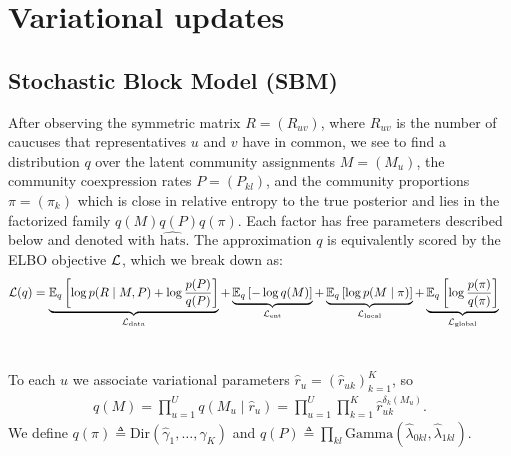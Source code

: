 \documentclass{article}
\begin{document}
\section{Variational updates}

\subsection{Stochastic Block Model (SBM)}
\label{sbmvi}

After observing the symmetric matrix $R = (R_{uv})$, where $R_{uv}$ is the number of caucuses that representatives $u$ and $v$ have in common, we see to find a distribution $q$ over the latent community assignments $M = (M_u)$, the community coexpression rates $P = (P_{kl})$, and the community proportions $\pi = (\pi_k)$ which is close in relative entropy to the true posterior and lies in the factorized family $q(M)q(P)q(\pi)$. Each factor has free parameters described below and denoted with $\widehat{\text{hats}}$. The approximation $q$ is equivalently scored by the ELBO objective $\mathcal{L}$, which we break down as:%
\begin{equation*}
\begin{split}
\mathcal{L}(q)
&= \underbrace{\mathbb{E}_q\left[\log p(R\mid M,P)+ \log\frac{p(P)}{q(P)}\right]}_{\mathcal{L}_{\text{data}}}
+ \underbrace{\mathbb{E}_q\left[-\log q(M)\right]}_{\mathcal{L}_{\text{ent}}}
+ \underbrace{\mathbb{E}_q\left[\log p(M\mid \pi)\right]}_{\mathcal{L}_{\text{local}}}
+ \underbrace{\mathbb{E}_q\left[\log\frac{p(\pi)}{q(\pi)}\right]}_{\mathcal{L}_{\text{global}}}
\end{split}
\end{equation*}
~\vspace{-1em}

 To each $u$ we associate variational parameters $\widehat r_u = \left(\widehat r_{uk}\right)_{k=1}^K$, so
\begin{align}
q(M) = \prod_{u=1}^U q(M_u\mid \widehat r_u) 
= \prod_{u=1}^U \prod_{k=1}^K \widehat r_{uk}^{\delta_k(M_u)}.
\end{align}
We define 
$q(\pi) \triangleq \text{Dir}(\widehat \gamma_1, \dots, \widehat \gamma_K)$ and $q(P) \triangleq \prod_{kl}\text{Gamma}(\widehat \lambda_{0kl},\widehat \lambda_{1kl})$. %
\end{document}
